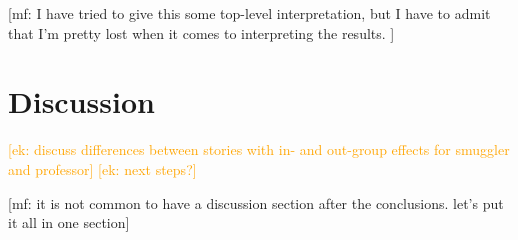 \documentclass[10pt,letterpaper]{article}
\newcommand{\ek}[1]{\textcolor{Orange}{[ek: #1]}}
\newcommand{\mf}[1]{\textcolor{PinkyPurple}{[mf: #1]}}
\begin{document}
\mf{I have tried to give this some top-level interpretation, but I have to admit that I'm pretty lost when it comes to interpreting the results. }

    
\section{Discussion}
\ek{discuss differences between stories with in- and out-group effects for smuggler and professor}
\ek{next steps?}

\mf{it is not common to have a discussion section after the conclusions. let's put it all in one section}



\setlength{\bibleftmargin}{.125in}
\setlength{\bibindent}{-\bibleftmargin}


\end{document}
